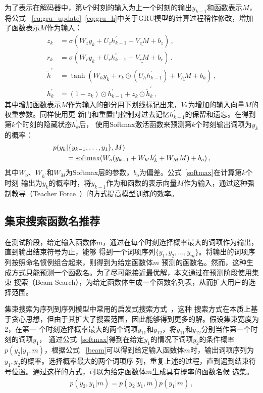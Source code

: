 为了表示在解码器中，第$k$个时刻的输入为上一个时刻的输出$y_{k-1}$和函数表示$M$，将公式
~\eqref{eq:gru_update}--\eqref{eq:gru_h}中关于GRU模型的计算过程稍作修改，增加了函数表示$M$作为输入：
\begin{align}
z_k &= \sigma(W_z y_k + U_z h^\prime_{k-1} + \underline{V_z M} + b_z) \,, \\
r_k &= \sigma(W_r y_k + U_r h^\prime_{k-1} + \underline{V_r M} + b_r) \,.\\
\tilde{h}^\prime &= \tanh(W_h y_k + r_k \odot (U_h h^\prime_{k-1}) + 
\underline{V_h M} + 
b_h) \,, \\
h^\prime_k &= (1-z_k)\odot h^\prime_{k-1} + z_k \odot \tilde h^\prime_k \,, 
\end{align}
其中增加函数表示$M$作为输入的部分用下划线标记出来，$V_{*}$为增加的输入向量$M$的权重参数。同样使用更
新门和重置门控制对过去记忆$h^\prime_{k-1}$的保留和遗忘。在得到第$k$个时刻的隐藏状态$h^\prime_k$后，
使用Softmax激活函数来预测第$k$个时刻输出词项为$y_k$的概率：
\begin{align}
p(y_k&|\{y_{k-1}, \dots, y_1\}, M) \notag\\
&= \text{softmax}(W_o(y_{k-1} + W_{h^\prime}h^\prime_k + W_M M) + b_o) \,,
\end{align}
\label{softmax}
其中$W_o$、$W_{h^\prime}$和$W_M$为Softmax层的参数，$b_o$为偏差。公式~\ref{softmax}在计算第$k$个时刻
输出为$y_k$的概率时，将$y_{k-1}$作为和函数的表示向量$M$作为输入，通过这种强制教导（Teacher
Force~\cite{Williams1989learning}）的方式提高模型训练的效率。

\subsection{集束搜索函数名推荐}
在测试阶段，给定输入函数体$m$，通过在每个时刻选择概率最大的词项作为输出，直到输出结束符号为止，能够
得到一个词项序列$\{y_1,y_2,\dots,y_m\}$。将输出的词项序列按照命名惯例组合起来，则得到为给定函数体$m$
预测的函数名。然而，这种生成方式只能预测一个函数名。为了尽可能接近最优解，本文通过在预测阶段使用集束
搜索（Beam Search），为给定函数体生成一个函数名列表，从而扩大用户的选择范围。

集束搜索为序列到序列模型中常用的启发式搜索方式~\cite{Graves2012Sequence,sutskever2014sequence}，这种
搜索方式在本质上基于贪心思想，但由于其扩大了搜索范围，因此能够得到更多的解。假设集束宽度为2，在第一
个时刻选择概率最大的两个词项$y_{11}$和$y_{12}$，将$y_{11}$和$y_{12}$分别当作第一个时刻的词项$y_1$，
通过公式~\eqref{softmax}得到在给定$y_1$的情况下词项$y_2$的条件概率$p(y_2|y_1,m)$，根据公式
~\eqref{beam}可以得到给定输入函数体$m$时，输出词项序列为$y_1,y_2$的概率。选择概率最大的两个词项序
列，重复上述的过程，直到遇到结束符号位置。通过这样的方式，可以为给定函数体$m$生成具有概率的函数名候
选集。
\begin{align}
p(y_2,y_1|m) = p(y_2|y_1,m)p(y_1|m) \,,
\end{align}
\label{beam}

